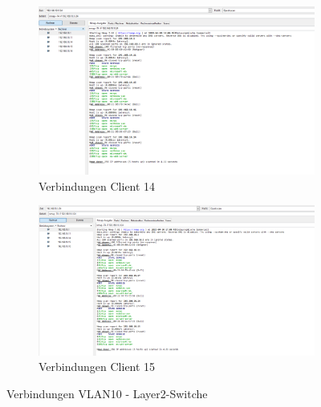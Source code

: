         \begin{figure}[H]
        \centering
            \begin{subfigure}{\linewidth}
                \centering
                \includegraphics[width=\linewidth]{images/Einrichtung Layer2-Switche/ServerVLAN10Client14.png}
                \caption{Verbindungen Client 14}
            \end{subfigure}
            \begin{subfigure}{\linewidth}
                \centering
                \includegraphics[width=\linewidth]{images/Einrichtung Layer2-Switche/ServerVLAN10Client15.png}
                \caption{Verbindungen Client 15}
            \end{subfigure}
        \caption{Verbindungen VLAN10 - Layer2-Switche}
        \end{figure}%
